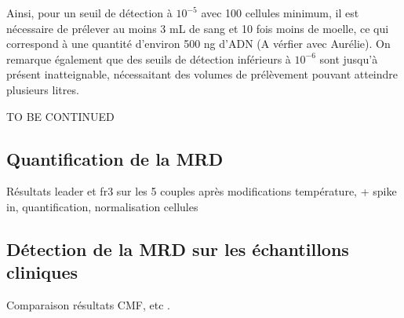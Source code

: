 Ainsi, pour un seuil de détection à $10^{-5}$ avec 100 cellules minimum, il est nécessaire de prélever au moins 3 mL de sang 
et 10 fois moins de moelle, ce qui correspond à une quantité d'environ 500 ng d'ADN (A vérfier avec Aurélie). On remarque également 
que des seuils de détection inférieurs à $10^{-6}$ sont jusqu'à présent inatteignable, nécessaitant des volumes de prélèvement pouvant 
atteindre plusieurs litres.

TO BE CONTINUED

\subsection{Quantification de la MRD}

Résultats leader et fr3 sur les 5 couples après modifications température, + spike in, quantification, normalisation cellules 

\subsection{Détection de la MRD sur les échantillons cliniques}

Comparaison résultats CMF, etc .